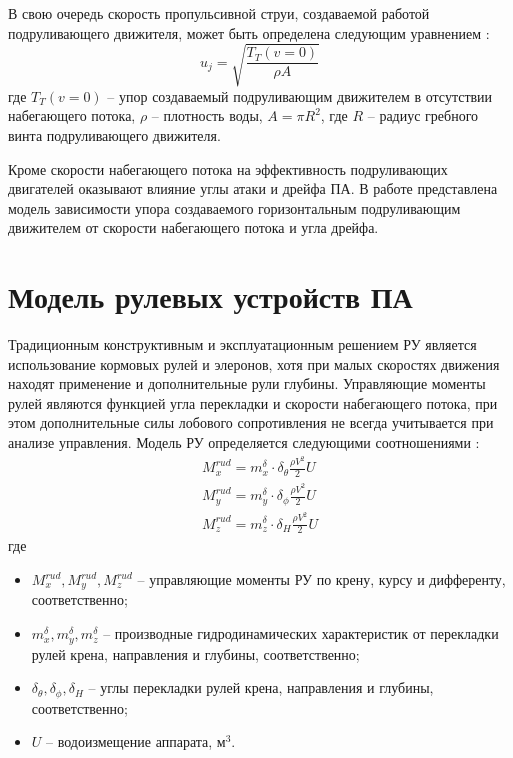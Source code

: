 В свою очередь скорость пропульсивной струи, создаваемой работой подруливающего движителя, может быть определена следующим уравнением \cite{palmer2009analysis}:
\begin{equation}
    \label{eq:jetflow_speed}
	u_j = \sqrt{\frac{T_T(v=0)}{\rho A}}
\end{equation}
\noindent где $T_T(v=0)$ -- упор создаваемый подруливающим движителем в отсутствии набегающего потока, $\rho$ -- плотность воды, $A=\pi R^2$, где $R$ -- радиус гребного винта подруливающего движителя.

Кроме скорости набегающего потока на эффективность подруливающих двигателей оказывают влияние углы атаки и дрейфа ПА.
В работе \cite{palmer2008modelling} представлена модель зависимости упора создаваемого горизонтальным подруливающим движителем от скорости набегающего потока и угла дрейфа.

\section{Модель рулевых устройств ПА}
Традиционным конструктивным и эксплуатационным решением РУ является использование кормовых рулей и элеронов, хотя при малых скоростях движения находят применение и дополнительные рули глубины.
Управляющие моменты рулей являются функцией угла перекладки и скорости набегающего потока, при этом дополнительные силы лобового сопротивления не всегда учитывается при анализе управления.
Модель РУ определяется следующими соотношениями \cite{боженов1986}:
\begin{equation}
	\label{eq:modelling-rudder}
	\begin{array}{ll}
    M_x^{rud} = m_x^{\delta} \cdot \delta_{\theta} \frac{\rho V^2}{2} U \\
    M_y^{rud} = m_y^{\delta} \cdot \delta_{\phi} \frac{\rho V^2}{2} U \\
    M_z^{rud} = m_z^{\delta} \cdot \delta_{H} \frac{\rho V^2}{2} U
    \end{array}
\end{equation}
\noindent где
\begin{itemize}
    \item $M_x^{rud}, M_y^{rud}, M_z^{rud}$ -- управляющие моменты РУ по крену, курсу и дифференту, соответственно;
    \item $m_x^{\delta}, m_y^{\delta}, m_z^{\delta}$ -- производные гидродинамических характеристик от перекладки рулей крена, направления и глубины, соответственно;
    \item $\delta_{\theta}, \delta_{\phi}, \delta_{H}$ -- углы перекладки рулей крена, направления и глубины, соответственно;
    \item $U$ -- водоизмещение аппарата, м$^3$.
\end{itemize}

